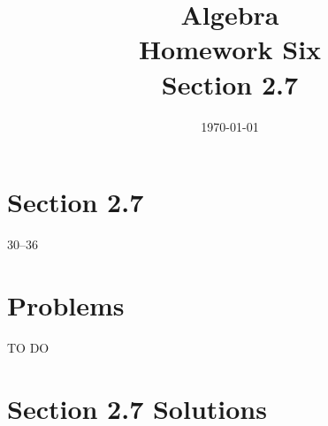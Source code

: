 \documentclass[letterpaper, landscape]{exam}
\title{Algebra \\ Homework Six \\ Section 2.7 }
\author{}
\date{\today}
\begin{document}
  \maketitle

  \section{Section 2.7}
  30--36

  \section{Problems}

  TO DO

  \ifprintanswers{}

    \section{Section 2.7 Solutions} 
\end{document}
